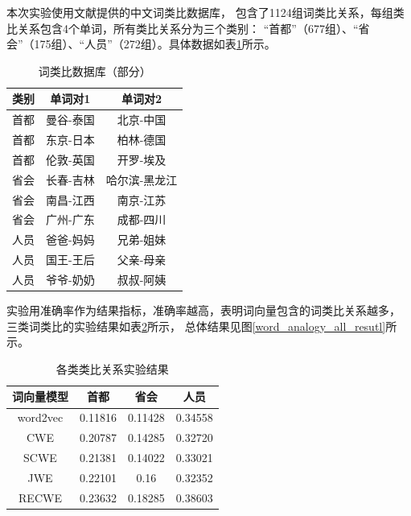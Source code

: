 本次实验使用文献\cite{chen2015joint}提供的中文词类比数据库，
包含了1124组词类比关系，每组类比关系包含4个单词，所有类比关系分为三个类别：
“首都”（677组）、“省会”（175组）、“人员”（272组）。具体数据如表\ref{word_analogy_table}所示。
\begin{table}[ht]
    \caption{词类比数据库（部分）}
    \begin{tabular}{|c|c|c|}
        \hline
        类别 & 单词对1 & 单词对2 \\
        \hline
        首都 & 曼谷-泰国 & 北京-中国 \\
        \hline
        首都 & 东京-日本 & 柏林-德国 \\
        \hline
        首都 & 伦敦-英国 & 开罗-埃及 \\
        \hline
        省会 & 长春-吉林 & 哈尔滨-黑龙江 \\
        \hline
        省会 & 南昌-江西 & 南京-江苏 \\
        \hline
        省会 & 广州-广东 & 成都-四川 \\
        \hline
        人员 & 爸爸-妈妈 & 兄弟-姐妹 \\
        \hline
        人员 & 国王-王后 &  父亲-母亲\\
        \hline
        人员 & 爷爷-奶奶 & 叔叔-阿姨 \\
        \hline
    \end{tabular}
    \label{word_analogy_table}
    \end{table}

实验用准确率作为结果指标，准确率越高，表明词向量包含的词类比关系越多，
三类词类比的实验结果如表\ref{word_analogy_resutl}所示，
总体结果见图\ref{word_analogy_all_resutl}所示。
\begin{table}[ht]
    \caption{各类类比关系实验结果}
    \begin{tabular}{|c|c|c|c|}
        \hline
        词向量模型 & 首都 & 省会 & 人员 \\
        \hline
        word2vec & 0.11816 & 0.11428 & 0.34558 \\
        \hline
        CWE & 0.20787 & 0.14285 & 0.32720 \\
        \hline
        SCWE & 0.21381 & 0.14022 & 0.33021 \\
        \hline
        JWE & 0.22101 & 0.16 & 0.32352 \\
        \hline
        RECWE & 0.23632 & 0.18285 & 0.38603 \\
        \hline
    \end{tabular}
    \label{word_analogy_resutl}
    \end{table}

